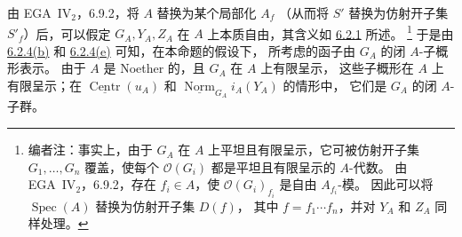 由 EGA~IV\(_2\)，6.9.2，将 \(A\) 替换为某个局部化 \(A_f\)
\textup{（从而将 \(S'\) 替换为仿射开子集 \(S'_f\)）}后，可以假定
\(G_A,Y_A,Z_A\) 在 \(A\) 上本质自由，其含义如
\hyperref[def:sga3-VIB-6.2.1]{6.2.1} 所述。%
\footnote{\label{note:sga3-VIB-97}编者注：事实上，由于 \(G_A\)
在 \(A\) 上平坦且有限呈示，它可被仿射开子集 \(G_1,\ldots,G_n\)
覆盖，使每个 \(\mathcal O(G_i)\) 都是平坦且有限呈示的 \(A\)-代数。
由 EGA~IV\(_2\)，6.9.2，存在 \(f_i\in A\)，使
\(\mathcal O(G_i)_{f_i}\) 是自由 \(A_{f_i}\)-模。
因此可以将 \(\operatorname{Spec}(A)\) 替换为仿射开子集 \(D(f)\)，
其中 \(f=f_1\cdots f_n\)，并对 \(Y_A\) 和 \(Z_A\) 同样处理。}
于是由 \hyperref[ex:sga3-VIB-6.2.4-b]{6.2.4\textup{(b)}} 和
\hyperref[ex:sga3-VIB-6.2.4-e]{6.2.4\textup{(e)}} 可知，在本命题的假设下，
所考虑的函子由 \(G_A\) 的闭 \(A\)-子概形表示。
由于 \(A\) 是 Noether 的，且 \(G_A\) 在 \(A\) 上有限呈示，
这些子概形在 \(A\) 上有限呈示；在
\(\underline{\operatorname{Centr}}(u_A)\) 和
\(\underline{\operatorname{Norm}}_{G_A}i_A(Y_A)\) 的情形中，
它们是 \(G_A\) 的闭 \(A\)-子群。

